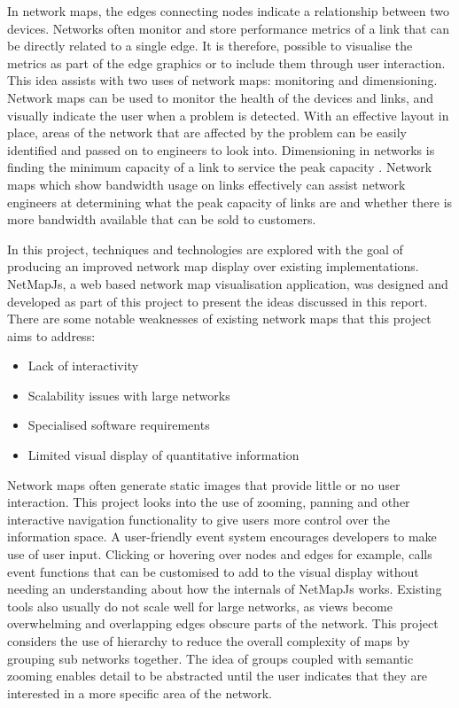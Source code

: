 \documentclass[11pt, a4paper]{article}
\begin{document}
In network maps, the edges connecting nodes indicate a relationship between two
devices. Networks often monitor and store performance metrics of a link that can
be directly related to a single edge. It is therefore, possible to visualise the
metrics as part of the edge graphics or to include them through user
interaction. This idea assists with two uses of network maps: monitoring and
dimensioning. Network maps can be used to monitor the health of the devices and
links, and visually indicate the user when a problem is detected. With an
effective layout in place, areas of the network that are affected by the problem
can be easily identified and passed on to engineers to look into. Dimensioning
in networks is finding the minimum capacity of a link to service the peak
capacity \cite{Girard_1990}. Network maps which show bandwidth usage on links
effectively can assist network engineers at determining what the peak capacity
of links are and whether there is more bandwidth available that can be sold to
customers.

In this project, techniques and technologies are explored with the goal of
producing an improved network map display over existing implementations.
NetMapJs, a web based network map visualisation application, was designed and
developed as part of this project to present the ideas discussed in this report.
There are some notable weaknesses of existing network maps that this project
aims to address:

\begin{itemize}
  \item Lack of interactivity
  \item Scalability issues with large networks
  \item Specialised software requirements
  \item Limited visual display of quantitative information
\end{itemize}

 
Network maps often generate static images that provide little or no user
interaction. This project looks into the use of zooming, panning and other
interactive navigation functionality to give users more control over the
information space. A user-friendly event system encourages developers to make
use of user input. Clicking or hovering over nodes and edges for example, calls
event functions that can be customised to add to the visual display without
needing an understanding about how the internals of NetMapJs works. Existing
tools also usually do not scale well for large networks, as views become
overwhelming and overlapping edges obscure parts of the network. This project
considers the use of hierarchy to reduce the overall complexity of maps by
grouping sub networks together. The idea of groups coupled with semantic zooming
enables detail to be abstracted until the user indicates that they are
interested in a more specific area of the network.
\end{document}
